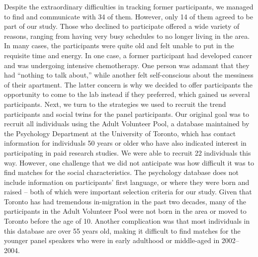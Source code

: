 \documentclass[output=paper]{langscibook}
\begin{document}
Despite the extraordinary difficulties in tracking former participants, we managed to find and communicate with 34 of them. However, only 14 of them agreed to be part of our study. Those who declined to participate offered a wide variety of reasons, ranging from having very busy schedules to no longer living in the area. In many cases, the participants were quite old and felt unable to put in the requisite time and energy. In one case, a former participant had developed cancer and was undergoing intensive chemotherapy. One person was adamant that they had ``nothing to talk about,'' while another felt self-conscious about the messiness of their apartment. The latter concern is why we decided to offer participants the opportunity to come to the lab instead if they preferred, which gained us several participants.
\largerpage
Next, we turn to the strategies we used to recruit the trend participants and social twins for the panel participants. Our original goal was to recruit all individuals using the Adult Volunteer Pool, a database maintained by the Psychology Department at the University of Toronto, which has contact information for individuals 50 years or older who have also indicated interest in participating in paid research studies. We were able to recruit 22 individuals this way. However, one challenge that we did not anticipate was how difficult it was to find matches for the social characteristics. The psychology database does not include information on participants’ first language, or where they were born and raised – both of which were important selection criteria for our study. Given that Toronto has had tremendous in-migration in the past two decades, many of the participants in the Adult Volunteer Pool were not born in the area or moved to Toronto before the age of 10. Another complication was that most individuals in this database are over 55 years old, making it difficult to find matches for the younger panel speakers who were in early adulthood or middle-aged in 2002--2004.
\end{document}
